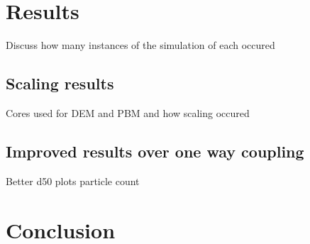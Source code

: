 \documentclass[fleqn,twoside,10pt]{article}
\begin{document}
\section{Results}
\label{results}
Discuss how many instances of the simulation of each occured
\subsection{Scaling results}
Cores used for DEM and PBM and how scaling occured
\subsection{Improved results over one way coupling}
Better d50 plots particle count
\section{Conclusion}



\end{document}
